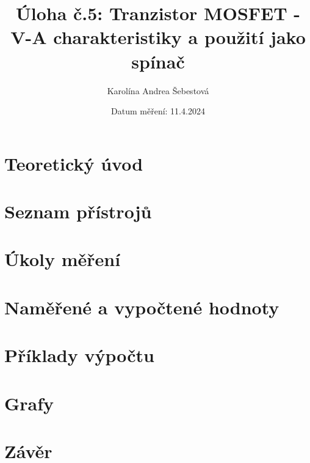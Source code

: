 \documentclass[a4paper, czech]{article}
\title{Úloha č.5: Tranzistor MOSFET - V-A charakteristiky a použití jako spínač}
\author{Karolína Andrea Šebestová}
\date{Datum měření: 11.4.2024}
\begin{document}
\maketitle

\section{Teoretický úvod}

\section{Seznam přístrojů}

\section{Úkoly měření}

\section{Naměřené a vypočtené hodnoty}

\section{Příklady výpočtu}

\section{Grafy}

\section{Závěr}
\end{document}
